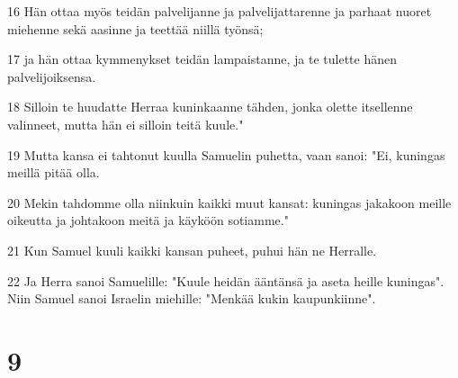 \par 16 Hän ottaa myös teidän palvelijanne ja palvelijattarenne ja parhaat nuoret miehenne sekä aasinne ja teettää niillä työnsä;
\par 17 ja hän ottaa kymmenykset teidän lampaistanne, ja te tulette hänen palvelijoiksensa.
\par 18 Silloin te huudatte Herraa kuninkaanne tähden, jonka olette itsellenne valinneet, mutta hän ei silloin teitä kuule."
\par 19 Mutta kansa ei tahtonut kuulla Samuelin puhetta, vaan sanoi: "Ei, kuningas meillä pitää olla.
\par 20 Mekin tahdomme olla niinkuin kaikki muut kansat: kuningas jakakoon meille oikeutta ja johtakoon meitä ja käyköön sotiamme."
\par 21 Kun Samuel kuuli kaikki kansan puheet, puhui hän ne Herralle.
\par 22 Ja Herra sanoi Samuelille: "Kuule heidän ääntänsä ja aseta heille kuningas". Niin Samuel sanoi Israelin miehille: "Menkää kukin kaupunkiinne".

\chapter{9}

